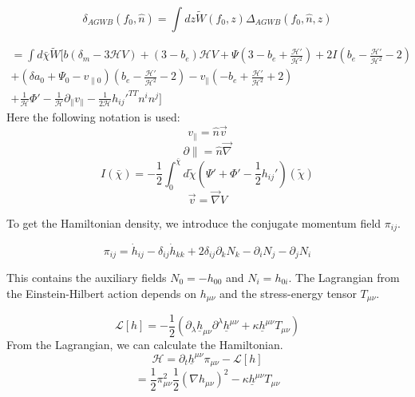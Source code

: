 
\begin{equation}
    \label{window_fct_def}
        \delta_{AGWB}(f_0, \hat{n})=\int dz \tilde{W}(f_0, z)\Delta_{AGWB}(f_0, \hat{n}, z)
    \end{equation}

\begin{equation}
    \begin{split}
        = \int d\bar{\chi} \tilde{W} [b(\delta_m - 3\mathcal{H}V)+(3-b_e)\mathcal{H}V+
        \Psi(3-b_e+\frac{\mathcal{H'}}{\mathcal{H}^2})+2I(b_e
        -\frac{\mathcal{H'}}{\mathcal{H}^2}-2) \\
        +(\delta a_0+\Psi_0 - v_{\parallel 0})(b_e
        -\frac{\mathcal{H'}}{\mathcal{H}^2}-2)-v_\parallel (-b_e
        +\frac{\mathcal{H'}}{\mathcal{H}^2}+2) \\
        +\frac{1}{\mathcal{H}}\Phi' 
        -\frac{1}{\mathcal{H}}\partial_\parallel v_\parallel 
        - \frac{1}{2\mathcal{H}}h_{ij}'^{TT} n^i n^j]
    \end{split}
    \end{equation}
    Here the following notation is used:
    \begin{equation}
            v_\parallel = \hat{n} \vec{v} 
    \end{equation}
    \begin{equation}
            \partial{\parallel} = \hat{n} \vec{\nabla} 
    \end{equation}
    \begin{equation}
            I(\bar{\chi}) = -\frac{1}{2} \int_0^{\bar{\chi}} d\tilde{\chi} 
            (\Psi' + \Phi ' -\frac{1}{2}h_{ij}')(\tilde{\chi} )
    \end{equation}
    \begin{equation}
            \vec{v} = \vec{\nabla} V 
    \end{equation}



    To get the Hamiltonian density, we introduce the conjugate momentum field $\pi_{ij}$.

\begin{equation}
    \pi_{ij}=\dot{h}_{ij}-\delta_{ij}\dot{h}_{kk}+2\delta_{ij}\partial_k
N_k-\partial_i N_j-\partial_j N_i 
\end{equation}

This contains the auxiliary fields $N_0=-h_{00}$ and $N_i=h_{0i}$. The Lagrangian from the Einstein-Hilbert action depends on $h_{\mu\nu}$ and the stress-energy tensor $T_{\mu\nu}$. 

\begin{equation}
    \mathcal{L}[h]=-\frac{1}{2}(\partial_\lambda \underline{h}_{\mu\nu} \partial^\lambda \underline{h}^{\mu\nu}+\kappa \underline{h}^{\mu\nu}T_{\mu\nu})
\end{equation}
From the Lagrangian, we can calculate the Hamiltonian.
\begin{equation}
    \mathcal{H}=\partial_t \underline{h}^{\mu\nu}\pi_{\mu\nu}-\mathcal{L}[h]
\end{equation}
\begin{equation}
    =\frac{1}{2}\pi_{\mu\nu}^2\frac{1}{2}(\nabla h_{\mu\nu})^2-\kappa \underline{h}^{\mu\nu}T_{\mu\nu}
\end{equation}
